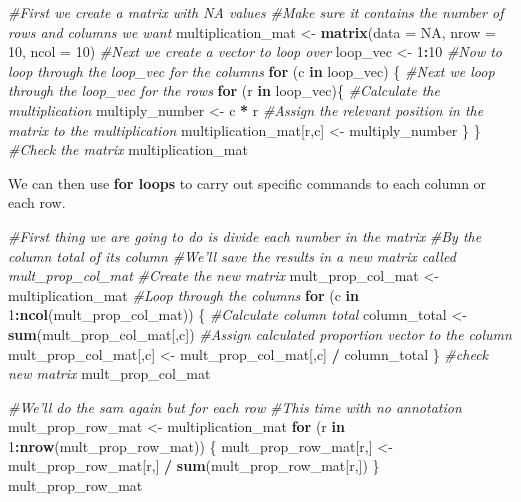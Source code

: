 \documentclass[]{book}
\newenvironment{Shaded}{\begin{snugshade}}{\end{snugshade}}
\newcommand{\KeywordTok}[1]{\textcolor[rgb]{0.13,0.29,0.53}{\textbf{#1}}}
\newcommand{\DataTypeTok}[1]{\textcolor[rgb]{0.13,0.29,0.53}{#1}}
\newcommand{\DecValTok}[1]{\textcolor[rgb]{0.00,0.00,0.81}{#1}}
\newcommand{\StringTok}[1]{\textcolor[rgb]{0.31,0.60,0.02}{#1}}
\newcommand{\CommentTok}[1]{\textcolor[rgb]{0.56,0.35,0.01}{\textit{#1}}}
\newcommand{\OtherTok}[1]{\textcolor[rgb]{0.56,0.35,0.01}{#1}}
\newcommand{\ControlFlowTok}[1]{\textcolor[rgb]{0.13,0.29,0.53}{\textbf{#1}}}
\newcommand{\OperatorTok}[1]{\textcolor[rgb]{0.81,0.36,0.00}{\textbf{#1}}}
\newcommand{\NormalTok}[1]{#1}
\begin{document}
\begin{Shaded}
\begin{Highlighting}[]
\CommentTok{#First we create a matrix with NA values}
\CommentTok{#Make sure it contains the number of rows and columns we want}
\NormalTok{multiplication_mat <-}\StringTok{ }\KeywordTok{matrix}\NormalTok{(}\DataTypeTok{data =} \OtherTok{NA}\NormalTok{, }\DataTypeTok{nrow =} \DecValTok{10}\NormalTok{, }\DataTypeTok{ncol =} \DecValTok{10}\NormalTok{)}
\CommentTok{#Next we create a vector to loop over}
\NormalTok{loop_vec <-}\StringTok{  }\DecValTok{1}\OperatorTok{:}\DecValTok{10}
\CommentTok{#Now to loop through the loop_vec for the columns}
\ControlFlowTok{for}\NormalTok{ (c }\ControlFlowTok{in}\NormalTok{ loop_vec) \{}
  \CommentTok{#Next we loop through the loop_vec for the rows}
  \ControlFlowTok{for}\NormalTok{ (r }\ControlFlowTok{in}\NormalTok{ loop_vec)\{}
    \CommentTok{#Calculate the multiplication}
\NormalTok{    multiply_number <-}\StringTok{ }\NormalTok{c }\OperatorTok{*}\StringTok{ }\NormalTok{r}
    \CommentTok{#Assign the relevant position in the matrix to the multiplication}
\NormalTok{    multiplication_mat[r,c] <-}\StringTok{ }\NormalTok{multiply_number}
\NormalTok{  \}}
\NormalTok{\}}
\CommentTok{#Check the matrix}
\NormalTok{multiplication_mat}
\end{Highlighting}
\end{Shaded}

We can then use \textbf{for loops} to carry out specific commands to
each column or each row.

\begin{Shaded}
\begin{Highlighting}[]
\CommentTok{#First thing we are going to do is divide each number in the matrix}
\CommentTok{#By the column total of its column}
\CommentTok{#We'll save the results in a new matrix called mult_prop_col_mat}
\CommentTok{#Create the new matrix}
\NormalTok{mult_prop_col_mat <-}\StringTok{ }\NormalTok{multiplication_mat}
\CommentTok{#Loop through the columns}
\ControlFlowTok{for}\NormalTok{ (c }\ControlFlowTok{in} \DecValTok{1}\OperatorTok{:}\KeywordTok{ncol}\NormalTok{(mult_prop_col_mat)) \{}
  \CommentTok{#Calculate column total}
\NormalTok{  column_total <-}\StringTok{ }\KeywordTok{sum}\NormalTok{(mult_prop_col_mat[,c])}
  \CommentTok{#Assign calculated proportion vector to the column}
\NormalTok{  mult_prop_col_mat[,c] <-}\StringTok{ }\NormalTok{mult_prop_col_mat[,c] }\OperatorTok{/}\StringTok{ }\NormalTok{column_total}
\NormalTok{\}}
\CommentTok{#check new matrix}
\NormalTok{mult_prop_col_mat}

\CommentTok{#We'll do the sam again but for each row}
\CommentTok{#This time with no annotation}
\NormalTok{mult_prop_row_mat <-}\StringTok{ }\NormalTok{multiplication_mat}
\ControlFlowTok{for}\NormalTok{ (r }\ControlFlowTok{in} \DecValTok{1}\OperatorTok{:}\KeywordTok{nrow}\NormalTok{(mult_prop_row_mat)) \{}
\NormalTok{  mult_prop_row_mat[r,] <-}\StringTok{ }
\StringTok{    }\NormalTok{mult_prop_row_mat[r,] }\OperatorTok{/}\StringTok{ }
\StringTok{    }\KeywordTok{sum}\NormalTok{(mult_prop_row_mat[r,])}
\NormalTok{\}}
\NormalTok{mult_prop_row_mat}
\end{Highlighting}
\end{Shaded}
\end{document}
